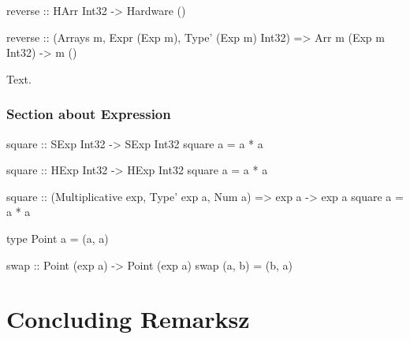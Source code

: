 \lipsum[4]

\begin{stub}
reverse :: HArr Int32 -> Hardware ()
\end{stub}

\lipsum[5]

\begin{stub}
reverse :: (Arrays m, Expr (Exp m), Type' (Exp m) Int32) =>
  Arr m (Exp m Int32) -> m ()
\end{stub}

Text.

\subsection{Section about Expression}

\lipsum[1]

\begin{code}
square :: SExp Int32 -> SExp Int32
square a = a * a
\end{code}

\lipsum[1]

\begin{stub}
square :: HExp Int32 -> HExp Int32
square a = a * a
\end{stub}

\lipsum[1]

\begin{stub}
square :: (Multiplicative exp, Type' exp a, Num a) => exp a -> exp a
square a = a * a
\end{stub}

\lipsum[1]

\begin{code}
type Point a = (a, a)

swap :: Point (exp a) -> Point (exp a)
swap (a, b) = (b, a)
\end{code}

\lipsum[1]

%
%

\chapter{Concluding Remarksz}
\label{ch:conc}

\lipsum[1]
